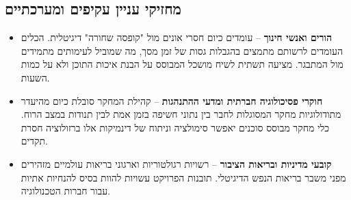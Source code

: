 \subsection{מחזיקי עניין עקיפים ומערכתיים}
\begin{itemize}
    \item \textbf{הורים ואנשי חינוך} -- עומדים כיום חסרי אונים מול "קופסה שחורה" דיגיטלית. הכלים העומדים לרשותם מתמצים בהגבלות גסות של זמן מסך, מה שמוביל לעימותים מתמידים מול המתבגר. \projectname{} מציעה תשתית לשיח מושכל המבוסס על הבנת איכות התוכן ולא על כמות השעות.
    \item \textbf{חוקרי פסיכולוגיה חברתית ומדעי ההתנהגות} -- קהילת המחקר סובלת כיום מהיעדר מתודולוגיות מחקר המסוגלות לחבר בין נתוני חשיפה בזמן אמת לבין תנודות במצב הרוח. כלי מחקר מבוסס סוכנים יאפשר סימולציה וניתוח של דינמיקות אלו ברזולוציה חסרת תקדים.
    \item \textbf{קובעי מדיניות ובריאות הציבור} -- רשויות רגולטוריות וארגוני בריאות עולמיים מזהירים מפני משבר בריאות הנפש הדיגיטלי. תובנות הפרויקט עשויות להוות בסיס להנחיות אתיות עבור חברות הטכנולוגיה.
\end{itemize}

